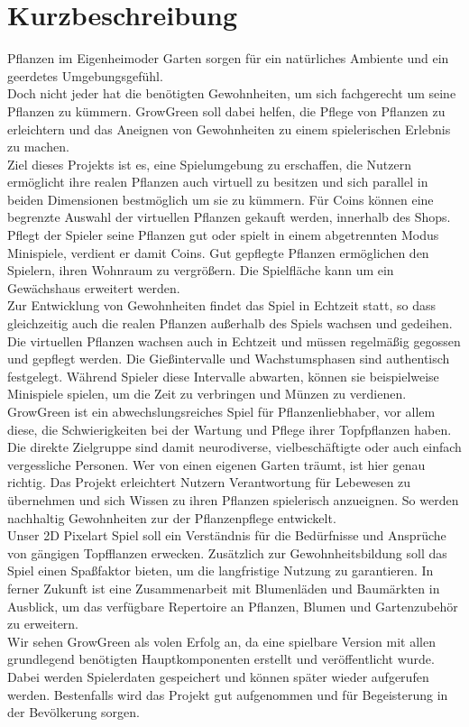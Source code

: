 \chapter{Kurzbeschreibung}\label{ch:kurzbeschreibung}
Pflanzen im Eigenheimoder Garten sorgen für ein natürliches Ambiente und ein geerdetes Umgebungsgefühl.\\
Doch nicht jeder hat die benötigten Gewohnheiten, um sich fachgerecht um seine Pflanzen zu kümmern.
GrowGreen soll dabei helfen, die Pflege von Pflanzen zu erleichtern und das Aneignen von Gewohnheiten 
zu einem spielerischen Erlebnis zu machen.\\[7pt]
Ziel dieses Projekts ist es, eine Spielumgebung zu erschaffen, die Nutzern ermöglicht ihre realen Pflanzen auch virtuell zu besitzen 
und sich parallel in beiden Dimensionen bestmöglich um sie zu kümmern. 
Für Coins können eine begrenzte Auswahl der virtuellen Pflanzen gekauft werden, innerhalb des Shops. 
Pflegt der Spieler seine Pflanzen gut oder spielt in einem abgetrennten Modus Minispiele, verdient er damit Coins. 
Gut gepflegte Pflanzen ermöglichen den Spielern, ihren Wohnraum zu vergrößern. Die Spielfläche kann um ein
Gewächshaus erweitert werden.\\[7pt]
Zur Entwicklung von Gewohnheiten findet das Spiel in Echtzeit statt, so dass gleichzeitig auch die realen Pflanzen
außerhalb des Spiels wachsen und gedeihen.
Die virtuellen Pflanzen wachsen auch in Echtzeit und müssen regelmäßig gegossen und gepflegt werden.
Die Gießintervalle und Wachstumsphasen sind authentisch festgelegt.
Während Spieler diese Intervalle abwarten, können sie beispielweise Minispiele spielen, um die Zeit zu verbringen und 
Münzen zu verdienen. \\[7pt]
GrowGreen ist ein abwechslungsreiches Spiel für Pflanzenliebhaber, vor allem diese, die Schwierigkeiten bei der Wartung und 
Pflege ihrer Topfpflanzen haben. Die direkte Zielgruppe sind damit neurodiverse, vielbeschäftigte oder auch einfach vergessliche Personen. Wer von einen eigenen Garten träumt, ist hier genau richtig. 
Das Projekt erleichtert Nutzern Verantwortung für Lebewesen zu übernehmen und sich Wissen zu ihren Pflanzen 
spielerisch anzueignen. So werden nachhaltig Gewohnheiten zur der Pflanzenpflege entwickelt.\\[7pt]
Unser 2D Pixelart Spiel soll ein Verständnis für die Bedürfnisse und Ansprüche von gängigen Topfflanzen erwecken.
Zusätzlich zur Gewohnheitsbildung soll das Spiel einen Spaßfaktor bieten, um die langfristige Nutzung zu garantieren.
In ferner Zukunft ist eine Zusammenarbeit mit Blumenläden und Baumärkten in Ausblick, um
das verfügbare Repertoire an Pflanzen, Blumen und Gartenzubehör zu erweitern. \\[7pt]
Wir sehen GrowGreen als volen Erfolg an, da eine spielbare Version mit allen grundlegend benötigten Hauptkomponenten 
erstellt und veröffentlicht wurde.
Dabei werden Spielerdaten gespeichert und können später wieder aufgerufen werden.
Bestenfalls wird das Projekt gut aufgenommen und für Begeisterung in der Bevölkerung sorgen.